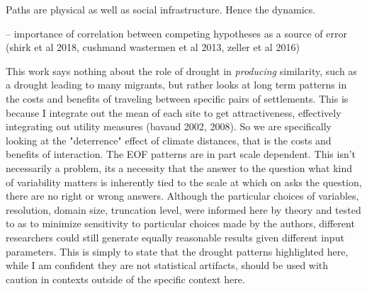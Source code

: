 \documentclass[10pt]{iopart}
\begin{document}
Paths are physical as well as social infrastructure. Hence the dynamics.

-- importance of correlation between competing hypotheses as a source of error (shirk et al 2018, cushmand wastermen et al 2013, zeller et al 2016)

This work says nothing about the role of drought in \textit{producing} similarity, such as a drought leading to many migrants, but rather looks at long term patterns in the costs and benefits of traveling between specific pairs of settlements. This is because I integrate out the mean of each site to get attractiveness, effectively integrating out utility measures (bavaud 2002, 2008). So we are specifically looking at the "deterrence" effect of climate distances, that is the costs and benefits of interaction.
The EOF patterns are in part scale dependent. This isn't necessarily a problem, its a necessity that the answer to the question what kind of variability matters is inherently tied to the scale at which on asks the question, there are no right or wrong answers. Although the particular choices of variables, resolution, domain size, truncation level, were informed here by theory and tested to as to minimize sensitivity to particular choices made by the authors, different researchers could still generate equally reasonable results given  different input parameters.  This is simply to state that the drought patterns highlighted here, while I am confident they are not statistical artifacts, should be used with caution in contexts outside of the specific context here.


\end{document}
